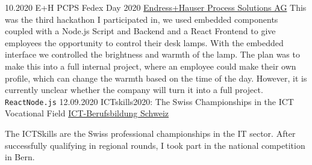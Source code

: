\documentclass[9pt]{developercv} %
\begin{document}


\begin{entrylist}
	\entry
		{10.2020}
		{E+H PCPS Fedex Day 2020}
		{\href{https://endress.com}{Endress+Hauser Process Solutions AG}}
		{This was the third hackathon I participated in, we used embedded components coupled with a Node.js Script and Backend and a React Frontend to give employees the opportunity to control their desk lamps. With the embedded interface we controlled the brightness and warmth of the lamp. The plan was to make this into a full internal project, where an employee could make their own profile, which can change the warmth based on the time of the day. However, it is currently unclear whether the company will turn it into a full project.\\ \texttt{React}\slashsep\texttt{Node.js}}
	\entry
		{12.09.2020}
		{ICTskills2020: The Swiss Championships in the ICT Vocational Field}
		{\href{https://www.ict-berufsbildung.ch/}{ICT-Berufsbildung Schweiz}}
		{The ICTSkills are the Swiss professional championships in the IT sector. After successfully qualifying in regional rounds, I took part in the national competition in Bern.

}
\end{entrylist}
\end{document}
